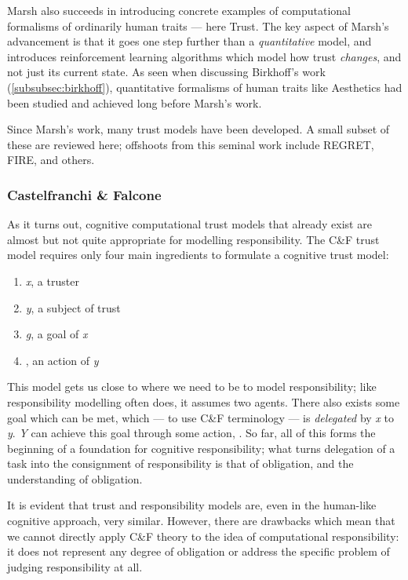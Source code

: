 Marsh also succeeds in introducing concrete examples of computational formalisms of ordinarily human traits --- here Trust. The key aspect of Marsh's advancement is that it goes one step further than a \emph{quantitative} model, and introduces reinforcement learning algorithms which model how trust \emph{changes}, and not just its current state. As seen when discussing Birkhoff's work (\cref{subsubsec:birkhoff}), quantitative formalisms of human traits like Aesthetics had been studied and achieved long before Marsh's work.\par

Since Marsh's work, many trust models have been developed. A small subset of these are reviewed here; offshoots from this seminal work include REGRET, FIRE, and others.\par

\subsubsection{Castelfranchi \& Falcone}
As it turns out, cognitive computational trust models that already exist are almost but not quite appropriate for modelling responsibility. The C\&F trust model requires only four main ingredients to formulate a cognitive trust model:

\begin{enumerate}
    \item \emph{x}, a truster
    \item \emph{y}, a subject of trust
    \item \emph{g}, a goal of \emph{x}
    \item \emph{\safealpha}, an action of \emph{y}
\end{enumerate}\par

This model gets us close to where we need to be to model responsibility; like responsibility modelling often does, it assumes two agents. There also exists some goal which can be met, which --- to use C\&F terminology --- is \emph{delegated} by \emph{x} to \emph{y}. \emph{Y} can achieve this goal through some action, \emph{\safealpha}. So far, all of this forms the beginning of a foundation for cognitive responsibility; what turns delegation of a task into the consignment of responsibility is that of obligation, and the understanding of obligation. \par

It is evident that trust and responsibility models are, even in the human-like cognitive approach, very similar. However, there are drawbacks which mean that we cannot directly apply C\&F theory to the idea of computational responsibility: it does not represent any degree of obligation or address the specific problem of judging responsibility at all.\par

